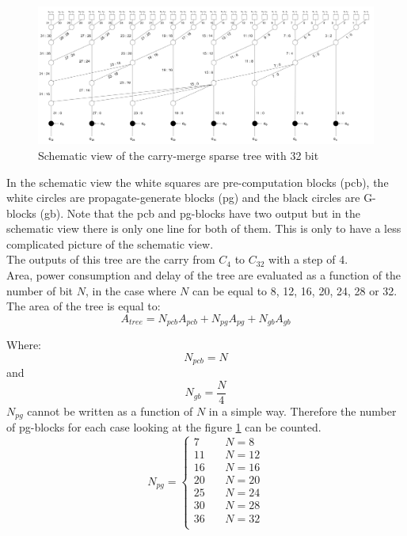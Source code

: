 \begin{figure}[H]
\centering
\includegraphics[width = 14cm]{pentium/tree_interno.jpg}
\caption{Schematic view of the carry-merge sparse tree with 32 bit}
\label{tree_interno}
\end{figure}

In the schematic view the white squares are pre-computation blocks (pcb), the white circles are propagate-generate blocks (pg) and the black circles are G-blocks (gb). Note that the pcb and pg-blocks have two output but in the schematic view there is only one line for both of them. This is only to have a less complicated picture of the schematic view.\\
The outputs of this tree are the carry from $C_4$ to $C_{32}$ with a step of 4.\\
Area, power consumption and delay of the tree are evaluated as a function of the number of bit $N$, in the case where $N$ can be equal to 8, 12, 16, 20, 24, 28 or 32.\\
The area of the tree is equal to:
\begin{equation}
A_{tree} = N_{pcb}A_{pcb}+N_{pg}A_{pg}+N_{gb}A_{gb}
\end{equation}

Where:
\begin{equation}
N_{pcb}=N
\end{equation}
and
\begin{equation}
N_{gb}=\frac{N}{4}
\end{equation}
$N_{pg}$ cannot be written as a function of $N$ in a simple way. Therefore the number of pg-blocks for each case looking at the figure \ref{tree_interno} can be counted.
\begin{equation}
N_{pg}=
   \begin{cases}
   7 \,\,\,\,\,\,\,\,\,\,\,\,\,\, N=8 \\
   11 \,\,\,\,\,\,\,\,\,\,\, N=12 \\
   16 \,\,\,\,\,\,\,\,\,\,\, N=16 \\
   20 \,\,\,\,\,\,\,\,\,\,\, N=20 \\
   25 \,\,\,\,\,\,\,\,\,\,\, N=24 \\
   30 \,\,\,\,\,\,\,\,\,\,\, N=28 \\
   36 \,\,\,\,\,\,\,\,\,\,\, N=32 \\
   \end{cases}
\end{equation}


